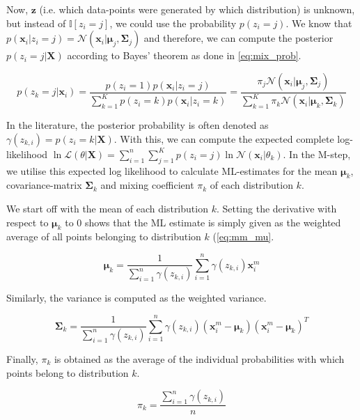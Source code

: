 Now, $\bm{z}$ (i.e. which data-points were generated by which distribution) is unknown, but instead of $\mathbb{I}[z_i=j]$, we could use the probability $p(z_i=j)$. We know that $p(\bm{x}_i|z_i=j) = \mathcal{N}(\bm{x}_i|\bm{\mu}_j, \bm{\Sigma}_j)$ and therefore, we can compute the posterior $p(z_i=j|\bm{X})$ according to Bayes' theorem as done in \ref{eq:mix_prob}.

\begin{equation}\label{eq:mix_prob}
    p(z_k=j|\textbf{x}_i)
    =\frac{p(z_i=1) p(\textbf{x}_i|z_i=j)}{\sum^K_{k=1}p(z_i=k)p(\textbf{x}_i|z_i=k)}
    = \frac{\pi_j\mathcal{N}(\textbf{x}_i|\bm{\mu}_j, \bm{\Sigma}_j)}{\sum_{k=1}^K\pi_k\mathcal{N}(\textbf{x}_i|\bm{\mu}_k, \bm{\Sigma}_k)} 
\end{equation}

In the literature, the posterior probability is often denoted as $\gamma(z_{k,i}) = p(z_i=k|\bm{X})$.
With this, we can compute the expected complete log-likelihood $\ln \mathcal{L}(\theta|\bm{X}) = \sum^n_{i=1} \sum^K_{j=1} p(z_i=j) \ln \mathcal{N}(\bm{x}_i|\theta_k)$. In the M-step, we utilise this expected log likelihood to calculate ML-estimates for the mean $\bm{\mu}_k$, covariance-matrix $\bm{\Sigma}_k$ and mixing coefficient $\pi_k$ of each distribution $k$.

We start off with the mean of each distribution $k$. Setting the derivative with respect to $\bm{\mu}_k$ to $0$ shows that the ML estimate is simply given as the weighted average of all points belonging to distribution $k$ (\ref{eq:mm_mu}.

\begin{equation}\label{eq:mm_mu}
    \bm{\mu}_k = \frac{1}{\sum^n_{i=1} \gamma(z_{k,i})} \sum^n_{i=1} \gamma(z_{k,i}) \textbf{x}^m_i
\end{equation}

Similarly, the variance is computed as the weighted variance.

\begin{equation}\label{eq:mm_var}
    \bm{\Sigma}_k = \frac{1}{\sum^n_{i=1} \gamma(z_{k,i})} \sum^n_{i=1} \gamma(z_{k,i}) (\textbf{x}^m_i-\bm{\mu}_k)(\textbf{x}^m_i-\bm{\mu}_k)^T
\end{equation}

Finally, $\pi_k$ is obtained as the average of the individual probabilities with which points belong to distribution $k$.

\begin{equation}\label{eq:mm_mix}
    \pi_k = \frac{\sum^n_{i=1}{} \gamma(z_{k,i})}{n}
\end{equation}

